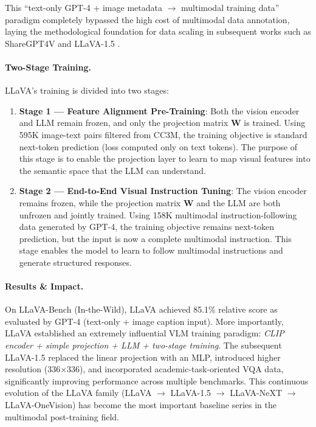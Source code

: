 \noindent
This ``text-only GPT-4 + image metadata $\rightarrow$ multimodal training data'' paradigm
completely bypassed the high cost of multimodal data annotation,
laying the methodological foundation for data scaling in subsequent works such as
ShareGPT4V \cite{chen2023sharegpt4v} and LLaVA-1.5 \cite{liu2023llava15}.

\paragraph{Two-Stage Training.}
LLaVA's training is divided into two stages:

\begin{enumerate}[leftmargin=2em]
  \item \textbf{Stage 1 --- Feature Alignment Pre-Training}:
    Both the vision encoder and LLM remain frozen,
    and only the projection matrix $\mathbf{W}$ is trained.
    Using 595K image-text pairs filtered from CC3M,
    the training objective is standard next-token prediction (loss computed only on text tokens).
    The purpose of this stage is to enable the projection layer to learn to map visual features into the semantic space that the LLM can understand.

  \item \textbf{Stage 2 --- End-to-End Visual Instruction Tuning}:
    The vision encoder remains frozen,
    while the projection matrix $\mathbf{W}$ and the LLM are both unfrozen and jointly trained.
    Using 158K multimodal instruction-following data generated by GPT-4,
    the training objective remains next-token prediction, but the input is now a complete multimodal instruction.
    This stage enables the model to learn to follow multimodal instructions and generate structured responses.
\end{enumerate}

\paragraph{Results \& Impact.}
On LLaVA-Bench (In-the-Wild),
LLaVA achieved 85.1\% relative score as evaluated by GPT-4 (text-only + image caption input).
More importantly, LLaVA established an extremely influential VLM training paradigm:
\textit{CLIP encoder + simple projection + LLM + two-stage training}.
The subsequent LLaVA-1.5 \cite{liu2023llava15} replaced the linear projection with an MLP,
introduced higher resolution (336$\times$336), and incorporated academic-task-oriented VQA data,
significantly improving performance across multiple benchmarks.
This continuous evolution of the LLaVA family
(LLaVA $\rightarrow$ LLaVA-1.5 $\rightarrow$ LLaVA-NeXT $\rightarrow$ LLaVA-OneVision)
has become the most important baseline series in the multimodal post-training field.

